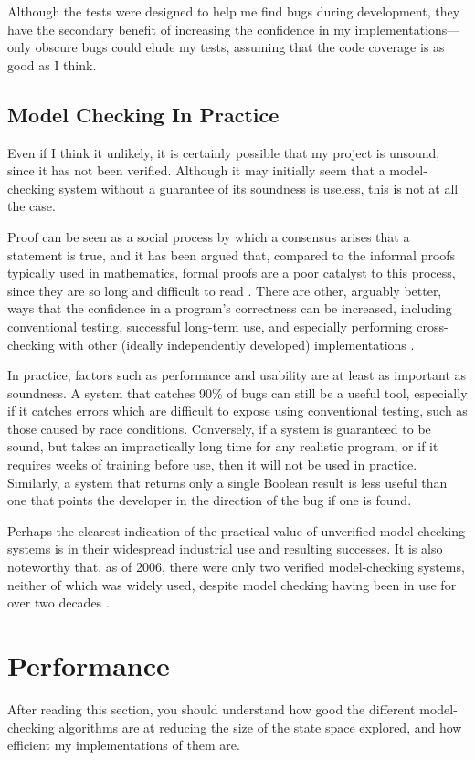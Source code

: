 \documentclass[12pt,a4paper,twoside,openright]{report}
\begin{document}
Although the tests were designed
to help me find bugs during
development, they have the
secondary benefit of increasing the
confidence in my implementations---only
obscure bugs could
elude my tests, assuming that the
code coverage is as good as I think.

\subsection{Model Checking In Practice}
Even if I think it unlikely, it is
certainly possible that my project is
unsound, since it has not
been verified.
Although it may initially seem
that a model-checking system without
a guarantee of its
soundness is useless, this
is not at all the case.

Proof can be seen as a social process
by which a consensus arises that
a statement is true, and it has been
argued that, compared to the informal
proofs typically used in mathematics,
formal proofs are a
poor catalyst to this process, since
they are so long and difficult to
read \cite{demi79}. There are other,
arguably better,
ways that the confidence in a program's
correctness can be increased, including
conventional testing, successful
long-term use, and especially performing
cross-checking with other (ideally
independently developed) implementations
\cite{tau02}.

In practice, factors such as
performance and usability are at least
as important as soundness. A system that
catches 90\% of bugs can still be a
useful tool, especially if it catches
errors which are difficult to expose
using conventional testing, such as
those caused by race conditions. 
Conversely, if a system
is guaranteed to be sound, but takes an
impractically long time for any realistic
program, or if it requires
weeks of training before use,
then it will not be used in
practice.
Similarly, a system that
returns only a single Boolean result
is less useful
than one that points the developer
in the direction of the bug if
one is found.

Perhaps the clearest indication of the
practical value of unverified
model-checking systems is in their widespread
industrial use and resulting successes.
\cite{kur08, brat04, low96, kars96, cof10, mill08, new15}
It is also noteworthy that, as of 2006,
there were only
two verified model-checking
systems, neither of which was widely
used, despite model
checking having been in use for
over two decades \cite{beck06}.


\section{Performance}
After reading this section, you should
understand how good the different
model-checking algorithms are at
reducing the size of the state
space explored, and how efficient
my implementations of them are.
\end{document}
